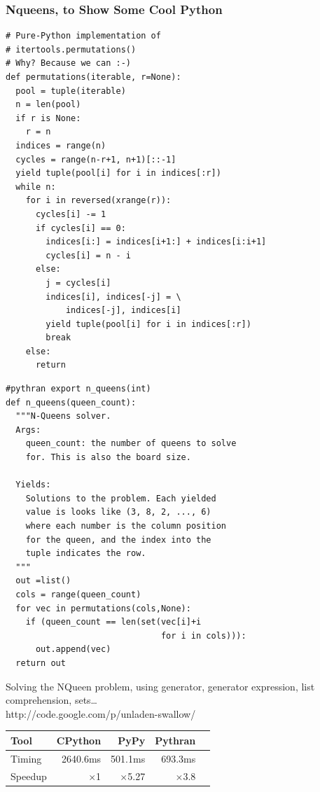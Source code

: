 \documentclass[aspectratio=1610]{beamer}
\begin{document}
\begin{frame}[fragile]
    \frametitle{Nqueens, to Show Some Cool Python}
    \begin{minipage}{0.49\textwidth}
            \begin{lstlisting}[frame=none,backgroundcolor=\color{white},basicstyle=\ttfamily\tiny]
# Pure-Python implementation of
# itertools.permutations()
# Why? Because we can :-)
def permutations(iterable, r=None):
  pool = tuple(iterable)
  n = len(pool)
  if r is None:
    r = n
  indices = range(n)
  cycles = range(n-r+1, n+1)[::-1]
  yield tuple(pool[i] for i in indices[:r])
  while n:
    for i in reversed(xrange(r)):
      cycles[i] -= 1
      if cycles[i] == 0:
        indices[i:] = indices[i+1:] + indices[i:i+1]
        cycles[i] = n - i
      else:
        j = cycles[i]
        indices[i], indices[-j] = \
            indices[-j], indices[i]
        yield tuple(pool[i] for i in indices[:r])
        break
    else:
      return
    \end{lstlisting}
\end{minipage}
\begin{minipage}{0.49\textwidth}
            \begin{lstlisting}[frame=none,backgroundcolor=\color{white},basicstyle=\ttfamily\tiny]
#pythran export n_queens(int)
def n_queens(queen_count):
  """N-Queens solver.
  Args:
    queen_count: the number of queens to solve
    for. This is also the board size.

  Yields:
    Solutions to the problem. Each yielded 
    value is looks like (3, 8, 2, ..., 6) 
    where each number is the column position 
    for the queen, and the index into the 
    tuple indicates the row.
  """
  out =list()
  cols = range(queen_count)
  for vec in permutations(cols,None):
    if (queen_count == len(set(vec[i]+i 
                               for i in cols))):
      out.append(vec)
  return out
\end{lstlisting}
\end{minipage}

    \begin{minipage}{0.49\textwidth}
      \scriptsize
Solving the NQueen problem, using generator, generator expression, list comprehension, sets\dots
    \\ http://code.google.com/p/unladen-swallow/
    \normalsize
\end{minipage}
\begin{minipage}{0.49\textwidth}

    \begin{tabular}{|l|r|r|r|r|}
        \hline
     Tool    &  CPython    &     PyPy     &  Pythran  \\
        \hline
     Timing  &  2640.6ms   &    501.1ms   &  693.3ms  \\
        \hline
     Speedup & $\times$1   & $\times$5.27 & $\times$3.8 \\
    \hline
\end{tabular}
\end{minipage}

\end{frame}
\end{document}
